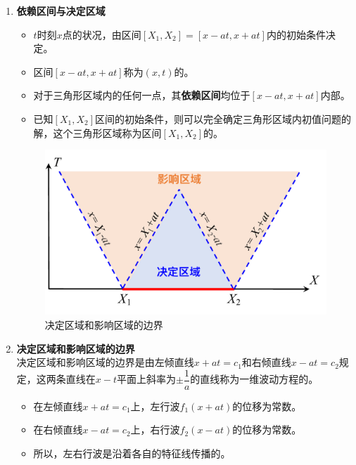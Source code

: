 \begin{enumerate}[1. ]
	\item \textbf{依赖区间与决定区域}
		\begin{itemize}
			\item $t$时刻$x$点的状况，由区间$[X_1, X_2] = [x-at, x+at]$内的初始条件决定。
			\item 区间$ [x-at, x+at]$称为$(x,t)$的。
			\item 对于三角形区域内的任何一点，其\textbf{依赖区间}均位于$ [x-at, x+at]$内部。
			\item 已知$[X_1,X_2]$区间的初始条件，则可以完全确定三角形区域内初值问题的解，这个三角形区域称为区间$[X_1,X_2]$的。
		\end{itemize}
	
		\begin{figure}[!htb]
			\centering
			\includegraphics[width=0.55\linewidth]{pic/影响区域和决定区域.pdf}
			\vspace*{-2em}
			\caption{决定区域和影响区域的边界}
			\label{决定区域和影响区域的边界}
		\end{figure}
	
	\item \textbf{决定区域和影响区域的边界}\\
		\hspace*{2em}决定区域和影响区域的边界是由左倾直线$x+at = c_1$和右倾直线$x - at = c_2$规定，这两条直线在$x - t$平面上斜率为$\pm \dfrac{1}{a}$的直线称为一维波动方程的。
		\begin{itemize}
			\item 在左倾直线$x + at =c_1$上，左行波$f_1(x + at)$的位移为常数。
			\item 在右倾直线$x - at = c_2$上，右行波$f_2(x - at)$的位移为常数。
			\item 所以，左右行波是沿着各自的特征线传播的。
		\end{itemize}
\end{enumerate}


